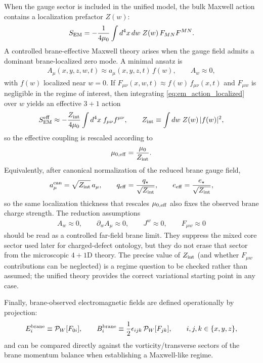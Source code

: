\documentclass[11pt]{article}
\newcommand{\estar}{e_\star}
\newcommand{\qstar}{q_\star}
\newcommand{\eeff}{e_{\rm eff}}
\newcommand{\qeff}{q_{\rm eff}}
\begin{document}
When the gauge sector is included in the unified model, the bulk Maxwell action
contains a localization prefactor $Z(w)$:
\begin{align}
S_{\rm EM} = -\frac{1}{4\mu_0}\int d^4x\,dw\; Z(w)\,F_{MN}F^{MN}.
\label{eq:em_action_localized}
\end{align}
A controlled brane-effective Maxwell theory arises when the gauge field admits a
dominant brane-localized zero mode.  A minimal ansatz is
\begin{align}
A_\mu(x,y,z,w,t)\approx a_\mu(x,y,z,t)\,f(w), \qquad A_w\approx 0,
\label{eq:gauge_zero_mode}
\end{align}
with $f(w)$ localized near $w=0$.  If $F_{\mu\nu}(x,w,t)\approx f(w)\,f_{\mu\nu}(x,t)$
and $F_{\mu w}$ is negligible in the regime of interest, then integrating
\eqref{eq:em_action_localized} over $w$ yields an effective $3{+}1$ action
\begin{align}
S_{\rm EM}^{\rm eff} \approx -\frac{Z_{\rm int}}{4\mu_0}\int d^4x\;
f_{\mu\nu}f^{\mu\nu},
\qquad
Z_{\rm int}\equiv\int dw\;Z(w)\,|f(w)|^2,
\end{align}
so the effective coupling is rescaled according to
\begin{align}
\mu_{0,{\rm eff}} = \frac{\mu_0}{Z_{\rm int}}.
\label{eq:mu_eff}
\end{align}
Equivalently, after canonical normalization of the reduced brane gauge field,
\begin{align}
a_\mu^{\rm can}=\sqrt{Z_{\rm int}}\,a_\mu,
\qquad
\qeff=\frac{\qstar}{\sqrt{Z_{\rm int}}},
\qquad
\eeff=\frac{\estar}{\sqrt{Z_{\rm int}}},
\end{align}
so the same localization thickness that rescales \(\mu_{0,{\rm eff}}\) also fixes the observed brane charge strength. The reduction assumptions
\begin{align}
A_w\approx 0,\qquad \partial_w A_\mu\approx 0,\qquad J^w\approx 0,\qquad F_{\mu w}\approx 0
\end{align}
should be read as a controlled far-field brane limit. They suppress the mixed core sector used later for charged-defect ontology, but they do not erase that sector from the microscopic \(4{+}1\)D theory. The precise value of $Z_{\rm int}$ (and whether $F_{\mu w}$ contributions can be
neglected) is a regime question to be checked rather than assumed; the unified
theory provides the correct variational starting point in any case.

Finally, brane-observed electromagnetic fields are defined operationally by
projection:
\begin{align}
E^{\rm brane}_i \equiv \mathcal{P}_W[F_{0i}],\qquad
B^{\rm brane}_i \equiv \frac{1}{2}\epsilon_{ijk}\,\mathcal{P}_W[F_{jk}],
\qquad i,j,k\in\{x,y,z\},
\end{align}
and can be compared directly against the vorticity/transverse sectors of the
brane momentum balance when establishing a Maxwell-like regime.
\end{document}
